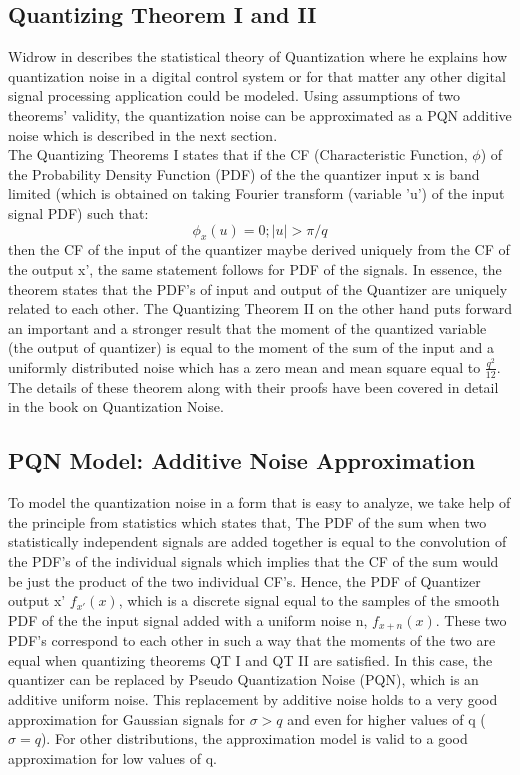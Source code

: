 \documentclass[colorlinks=true,pdfstartview=FitV,linkcolor=blue,
            citecolor=red,urlcolor=magenta]{ligodoc}
\begin{document}
\subsection{Quantizing Theorem I and II} Widrow in \cite{Kollar} describes the statistical theory of Quantization where he explains how quantization noise in a digital control system or for that matter any other digital signal processing application could be modeled. Using assumptions of two theorems' validity, the quantization noise can be approximated as a PQN additive noise which is described in the next section. \\ 
The Quantizing Theorems I states that if the CF (Characteristic Function, $\phi$) of the Probability Density Function (PDF) of the the quantizer input x is band limited (which is obtained on taking Fourier transform (variable 'u') of the input signal PDF) such that:
\begin{equation}
\phi_x(u) = 0 ; |u| >\pi/q  
\end{equation}
then the CF of the input of the quantizer maybe derived uniquely from the CF of the output x', the same statement follows for PDF of the signals. In essence, the theorem states that the PDF's of input and output of the Quantizer are uniquely related to each other.
The Quantizing Theorem II on the other hand puts forward an important and a stronger result that the moment of the quantized variable (the output of quantizer) is equal to the moment of the sum of the input and a uniformly distributed noise which has a zero mean and mean square equal to $\frac{q^{2}}{12}$. 
\\The details of these theorem along with their proofs have been covered in detail in \cite{Widrow} the book on Quantization Noise.
\subsection{PQN Model: Additive Noise Approximation} To model the quantization noise in a form that is easy to analyze, we take help of the principle from statistics which states that, The PDF of the sum when two statistically independent signals are added together is equal to the convolution of the PDF's of the individual signals which implies that the CF of the sum would be just the product of the two individual CF's.
Hence, the PDF of Quantizer output x' $f_{x'}(x)$, which is a discrete signal equal to the samples of the smooth PDF of the the input signal added with a uniform noise n, $f_{x+n}(x)$. These two PDF's correspond to each other in such a way that the moments of the two are equal when quantizing theorems QT I and QT II are satisfied.   In this case, the quantizer can be replaced by Pseudo Quantization Noise (PQN), which is an additive uniform noise. This replacement by additive noise holds to a  very good approximation for Gaussian signals for $\sigma > q$ and even for higher values of q ($\sigma = q$). For other distributions, the approximation model is valid to a good approximation for low values of q.
\end{document}
